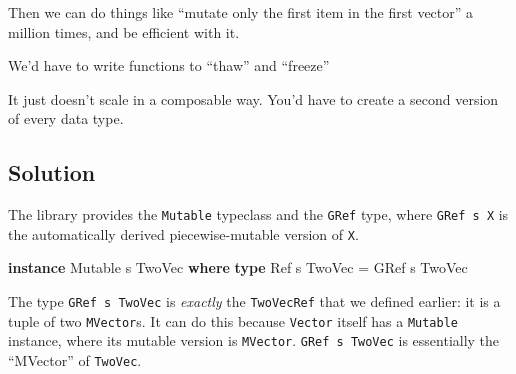 \documentclass[]{article}
\newenvironment{Shaded}{}{}
\newcommand{\DataTypeTok}[1]{\textcolor[rgb]{0.56,0.13,0.00}{#1}}
\newcommand{\KeywordTok}[1]{\textcolor[rgb]{0.00,0.44,0.13}{\textbf{#1}}}
\newcommand{\NormalTok}[1]{#1}
\newcommand{\OperatorTok}[1]{\textcolor[rgb]{0.40,0.40,0.40}{#1}}
\newcommand{\OtherTok}[1]{\textcolor[rgb]{0.00,0.44,0.13}{#1}}
\begin{document}
Then we can do things like ``mutate only the first item in the first vector'' a
million times, and be efficient with it.

We'd have to write functions to ``thaw'' and ``freeze''

\begin{Shaded}
\end{Shaded}

It just doesn't scale in a composable way. You'd have to create a second version
of every data type.

\subsection{Solution}\label{solution}

The library provides the \texttt{Mutable} typeclass and the \texttt{GRef} type,
where \texttt{GRef\ s\ X} is the automatically derived piecewise-mutable version
of \texttt{X}.

\begin{Shaded}
\begin{Highlighting}[]
\KeywordTok{instance} \DataTypeTok{Mutable}\NormalTok{ s }\DataTypeTok{TwoVec} \KeywordTok{where}
    \KeywordTok{type} \DataTypeTok{Ref}\NormalTok{ s }\DataTypeTok{TwoVec} \OtherTok{=} \DataTypeTok{GRef}\NormalTok{ s }\DataTypeTok{TwoVec}
\end{Highlighting}
\end{Shaded}

The type \texttt{GRef\ s\ TwoVec} is \emph{exactly} the \texttt{TwoVecRef} that
we defined earlier: it is a tuple of two \texttt{MVector}s. It can do this
because \texttt{Vector} itself has a \texttt{Mutable} instance, where its
mutable version is \texttt{MVector}. \texttt{GRef\ s\ TwoVec} is essentially the
``MVector'' of \texttt{TwoVec}.
\end{document}
